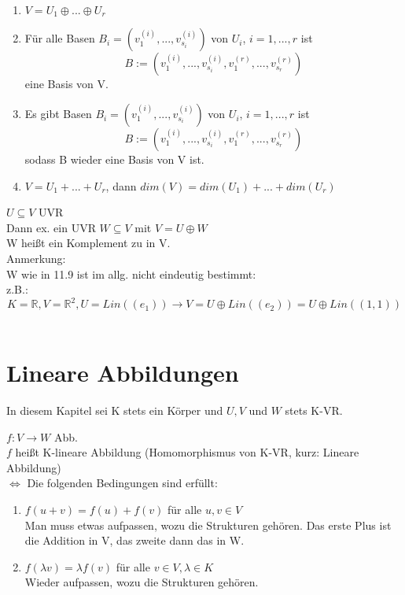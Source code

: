 \documentclass[headsepline,12pt,a4paper]{scrartcl}
\makeatletter
\def\myItem{%
   \@ifnextchar[ \@myItem{\@noitemargtrue\@myItem[\@itemlabel]}}
\def\@myItem[#1]{\item[#1]\mbox{}\\}
\makeatother
\begin{document}
\begin{enumerate}
\item $V= U_1 \oplus ... \oplus U_r$ \\
\item Für alle Basen $B_i=(v_1^{(i)},...,v_{s_i}^{(i)})$ von $U_i$, $i=1,...,r$ ist 
$$ B:=(v_1^{(i)},...,v_{s_i}^{(i)}, v_1^{(r)},...,v_{s_r}^{(r)}) $$
eine Basis von V. \\
\item Es gibt Basen $B_i=(v_1^{(i)},...,v_{s_i}^{(i)})$ von $U_i$, $i=1,...,r$ ist 
$$ B:=(v_1^{(i)},...,v_{s_i}^{(i)}, v_1^{(r)},...,v_{s_r}^{(r)}) $$
sodass B wieder eine Basis von V ist. \\
\item $V= U_1+...+U_r$, dann $dim(V)=dim(U_1)+...+dim(U_r)$ \\
\end{enumerate}

\myItem[Satz 11.9] $U \subseteq V$ UVR\\
Dann ex. ein UVR $W \subseteq V$ mit $V = U \oplus W$ \\
W heißt ein Komplement zu in V. \\

Anmerkung: \\ W wie in 11.9 ist im allg. nicht eindeutig bestimmt: \\
z.B.: $$K=\mathbb{R},V=\mathbb{R}^2, U=Lin((e_1)) \rightarrow V=U \oplus Lin((e_2)) = U \oplus Lin((1,1))$$ \\

\section*{Lineare Abbildungen}

In diesem Kapitel sei K stets ein Körper und $U,V$ und $W$ stets K-VR.

\myItem[Def. 12.1] $f:V \rightarrow W$ Abb. \\
$f$ heißt K-lineare Abbildung (Homomorphismus von K-VR, kurz: Lineare Abbildung)  \\
$\Leftrightarrow$ Die folgenden Bedingungen sind erfüllt: \\
\begin{enumerate}
\item $f(u+v)=f(u)+f(v)$ für alle $u,v \in V $ \\
Man muss etwas aufpassen, wozu die Strukturen gehören. Das erste Plus ist die Addition in V, das zweite dann das in W. \\
\item $f(\lambda v )= \lambda f(v)$ für alle $v\in V, \lambda \in K$ \\
Wieder aufpassen, wozu die Strukturen gehören. \\

\end{enumerate}
\end{document}

